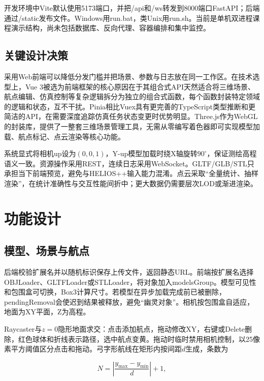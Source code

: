 \documentclass[a4paper,fleqn]{cas-sc}
\begin{document}
开发环境中Vite默认使用5173端口，并把/api和/ws转发到8000端口FastAPI；后端通过/static发布文件。Windows用run.bat，类Unix用run.sh。当前是单机双进程课程演示结构，尚未包括数据库、反向代理、容器编排和集中监控。

\subsection{关键设计决策}

采用Web前端可以降低分发门槛并把场景、参数与日志放在同一工作区\citep{viswebdrone,lidarWebgis}。在技术选型上，Vue 3被选为前端框架的核心原因在于其组合式API天然适合将三维场景、航点编辑、仿真控制等复杂逻辑拆分为独立的组合式函数，每个函数封装特定领域的逻辑和状态，互不干扰。Pinia相比Vuex具有更完善的TypeScript类型推断和更简洁的API，在需要深度追踪仿真任务状态变更时优势明显。Three.js作为WebGL的封装库，提供了一整套三维场景管理工具，无需从零编写着色器即可实现模型加载、航点标记、点云渲染等核心功能。

系统显式将相机up设为$(0,0,1)$，Y-up模型加载时绕X轴旋转$90^\circ$，保证测绘高程语义一致。资源操作采用REST，连续日志采用WebSocket\citep{fielding2000rest,WebSocket}。GLTF/GLB/STL只承担当下前端预览，避免与HELIOS++输入能力混淆。点云采取\enquote{全量统计、抽样渲染}，在统计准确性与交互性能间折中；更大数据仍需要层次LOD或渐进渲染\citep{pointCloudRendering,pointCloudTerrain}。

\section{功能设计}

\subsection{模型、场景与航点}

后端校验扩展名并以随机标识保存上传文件，返回静态URL。前端按扩展名选择OBJLoader、GLTFLoader或STLLoader，将对象加入modelsGroup。模型可见性和包围盒可切换，Box3计算尺寸。若模型在异步加载完成前已被删除，pendingRemoval会使迟到结果被释放，避免\enquote{幽灵对象}。相机按包围盒自适应，地面为XY平面，Z为高程。

Raycaster与$z=0$隐形地面求交：点击添加航点，拖动修改XY，右键或Delete删除，红色球体和折线表示路径，选中航点变黄。拖动时临时禁用相机控制，以25像素平方阈值区分点击和拖动。弓字形航线在矩形内按间距$d$生成，条数为

\begin{equation}
    N = \left| \frac{y_{\max} - y_{\min}}{d} \right| + 1,
\end{equation}
\end{document}

